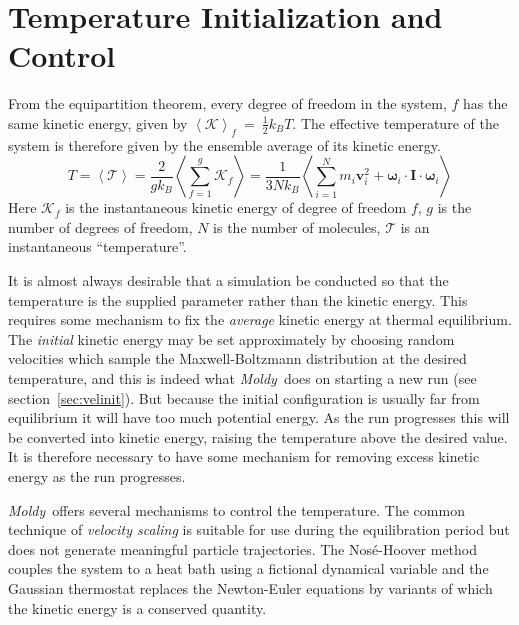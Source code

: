 \documentclass[a4paper,twoside]{report}
\providecommand{\bm}[1]{\mathbf{#1}}
\newcommand{\moldy}{\emph{Moldy}}
\begin{document}
\section{Temperature Initialization and Control}%
From the equipartition theorem, every degree of freedom in the system,
$f$ has the same kinetic energy, given by $\left < \mathcal{K} \right
>_f~=~\frac{1}{2}k_BT$.  The effective temperature of the system is
therefore given by the ensemble average of its kinetic energy.
\begin{equation}
\label{eqn:equipartition}
T = \left < \mathcal{T} \right > = \frac{2}{gk_B} \left <
  \sum_{f=1}^{g} \mathcal{K}_f \right > = \frac{1}{3Nk_B}\left <
  \sum_{i=1}^N m_i \bm{v}_i^2 + \bm{\omega}_i \cdot \bm{I} \cdot
  \bm{\omega}_i \right >
\end{equation}
Here $\mathcal{K}_f$ is the instantaneous kinetic energy of degree of
freedom $f$, $g$ is the number of degrees of freedom, $N$ is the
number of molecules, $\mathcal{T}$ is an instantaneous ``temperature''.

It is almost always desirable that a simulation be conducted so that
the temperature is the supplied parameter rather than the kinetic
energy.  This requires some mechanism to fix the \emph{average}
kinetic energy at thermal equilibrium.  The \emph{initial} kinetic
energy may be set approximately by choosing random velocities which
sample the Maxwell-Boltzmann distribution at the desired temperature,
and this is indeed what \moldy\ does on starting a new run (see
section~\ref{sec:velinit}).  But because the initial configuration is
usually far from equilibrium it will have too much potential energy.
As the run progresses this will be converted into kinetic energy,
raising the temperature above the desired value. It is therefore
necessary to have some mechanism for removing excess kinetic energy as
the run progresses.

\moldy\ offers several mechanisms to control the temperature. The
common technique of \emph{velocity scaling} is suitable for use
during the equilibration period but does not generate meaningful
particle trajectories. The Nos{\'e}-Hoover method couples the system to
a heat bath using a fictional dynamical variable and the Gaussian
thermostat replaces the Newton-Euler equations by variants of which
the kinetic energy is a conserved quantity.
\end{document}
